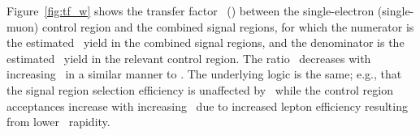 Figure~\ref{fig:tf_w} shows the transfer factor \RWe\ (\RWm) between the single-electron (single-muon) control region and the combined signal regions, for which the numerator is the estimated \wlng\ yield in the combined signal regions, and the denominator is the estimated \wlng\ yield in the relevant control region. 
The ratio \RWl\ decreases with increasing \ETg\ in a similar manner to \RZll.
The underlying logic is the same; e.g., that the signal region selection efficiency is unaffected by \ETg\ while the control region acceptances increase with increasing \ETg\ due to increased lepton efficiency resulting from lower \PW\ rapidity. 

\begin{figure}[htbp]
  \centering
\end{figure}
